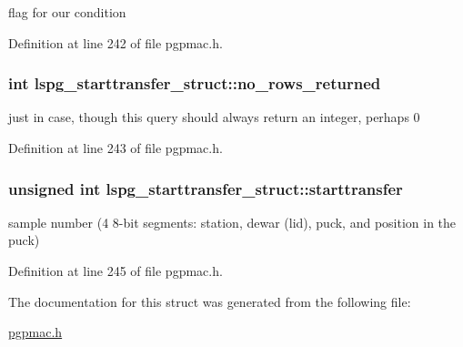 flag for our condition 



Definition at line 242 of file pgpmac.\-h.

\hypertarget{structlspg__starttransfer__struct_aa384ccd326d9247317f77072b93f94ca}{
\subsubsection[{no\-\_\-rows\-\_\-returned}]{\setlength{\rightskip}{0pt plus 5cm}int lspg\-\_\-starttransfer\-\_\-struct\-::no\-\_\-rows\-\_\-returned}}\label{structlspg__starttransfer__struct_aa384ccd326d9247317f77072b93f94ca}


just in case, though this query should always return an integer, perhaps 0 



Definition at line 243 of file pgpmac.\-h.

\hypertarget{structlspg__starttransfer__struct_af01b6bac6db9830719aef63e552312eb}{
\subsubsection[{starttransfer}]{\setlength{\rightskip}{0pt plus 5cm}unsigned int lspg\-\_\-starttransfer\-\_\-struct\-::starttransfer}}\label{structlspg__starttransfer__struct_af01b6bac6db9830719aef63e552312eb}


sample number (4 8-\/bit segments\-: station, dewar (lid), puck, and position in the puck) 



Definition at line 245 of file pgpmac.\-h.



The documentation for this struct was generated from the following file\-:\begin{DoxyCompactItemize}
\item 
\hyperlink{pgpmac_8h}{pgpmac.\-h}\end{DoxyCompactItemize}
